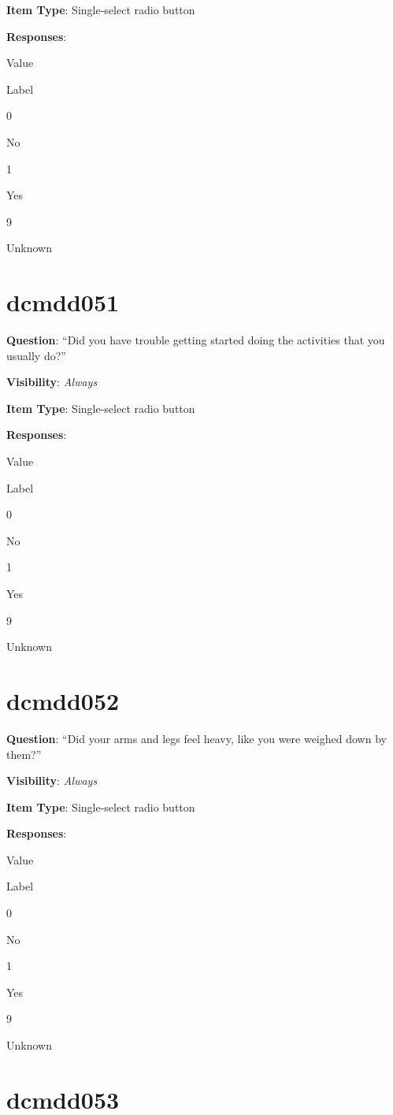 \documentclass[]{book}
\begin{document}
\textbf{Item Type}: Single-select radio button

\textbf{Responses}:

Value

Label

0

No

1

Yes

9

Unknown

\hypertarget{dcmdd051}{%
\section{dcmdd051}\label{dcmdd051}}

\textbf{Question}: ``Did you have trouble getting started doing the activities that you usually do?''

\textbf{Visibility}: \emph{Always}

\textbf{Item Type}: Single-select radio button

\textbf{Responses}:

Value

Label

0

No

1

Yes

9

Unknown

\hypertarget{dcmdd052}{%
\section{dcmdd052}\label{dcmdd052}}

\textbf{Question}: ``Did your arms and legs feel heavy, like you were weighed down by them?''

\textbf{Visibility}: \emph{Always}

\textbf{Item Type}: Single-select radio button

\textbf{Responses}:

Value

Label

0

No

1

Yes

9

Unknown

\hypertarget{dcmdd053}{%
\section{dcmdd053}\label{dcmdd053}}
\end{document}

